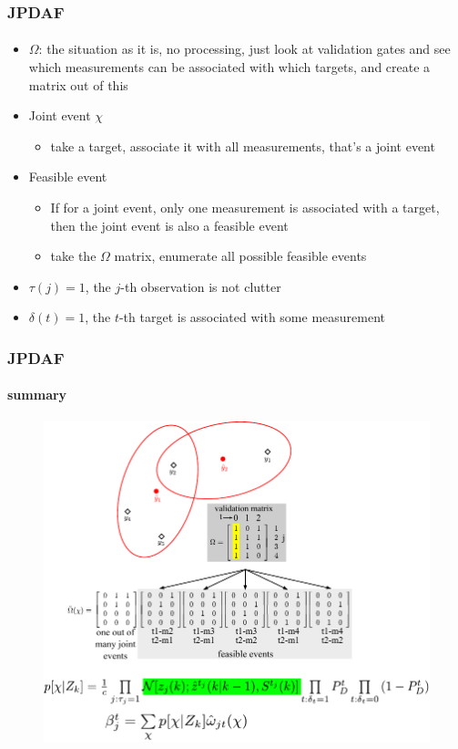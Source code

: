 \begin{frame}
\frametitle{JPDAF}
\framesubtitle{}
\logoCSIPCPL\mypagenum
	\begin{itemize}
		\item $\Omega$: the situation as it is, no processing, just look at validation gates and see which measurements can be associated with which targets, and create a matrix out of this
		\item Joint event $\chi$
			\begin{itemize}
				\item take a target, associate it with all measurements, that's a joint event
			\end{itemize}
		\item Feasible event
			\begin{itemize}
				\item If for a joint event, only one measurement is associated with a target, then the joint event is also a feasible event
				\item take the $\Omega$ matrix, enumerate all possible feasible events
			\end{itemize}
		\item $\tau(j)=1$, the $j$-th observation is not clutter
		\item $\delta(t)=1$, the $t$-th target is associated with some measurement

	\end{itemize}
\end{frame}






\begin{frame}
\frametitle{JPDAF}
\framesubtitle{summary}
\logoCSIPCPL\mypagenum
	\begin{figure}
		\includegraphics[width=1.0\textwidth]{figs/TRK_JPDAF_twoTargetScenario.pdf}
	\end{figure}
\end{frame}

